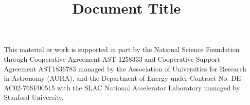 \documentclass[11pt,twoside]{article}
\begin{document}

\title{Document Title}








\acknowledgments This material or work is supported in part by the National Science Foundation through Cooperative Agreement AST-1258333 and Cooperative Support Agreement AST1836783 managed by the Association of Universities for Research in Astronomy (AURA), and the Department of Energy under Contract No. DE-AC02-76SF00515 with the SLAC National Accelerator Laboratory managed by Stanford University.


\end{document}
